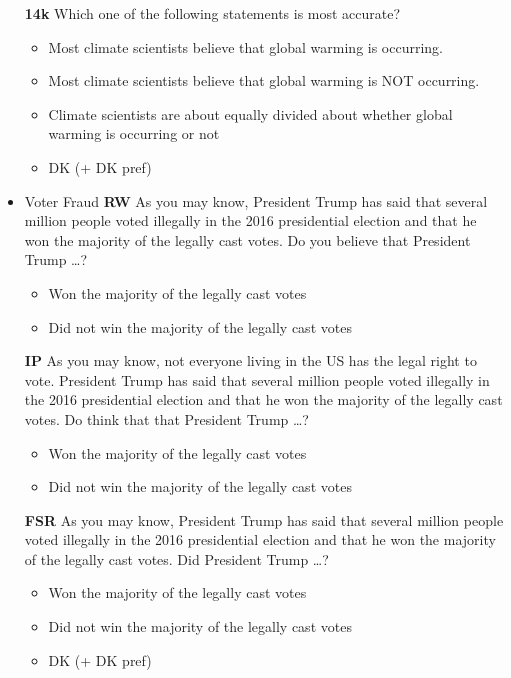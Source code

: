 \begin{itemize}
	\textbf{14k}\newline
	Which one of the following statements is most accurate?
	\begin{itemize}
		\item Most climate scientists believe that global warming is occurring.
		\item Most climate scientists believe that global warming is NOT occurring.
		\item Climate scientists are about equally divided about whether global warming is occurring or not
		\item DK (+ DK pref)
	\end{itemize}
	
	\item Voter Fraud\newline
	\textbf{RW}\newline
	As you may know, President Trump has said that several million people voted
	illegally in the 2016 presidential election and that he won the majority of the legally
	cast votes. Do you believe that President Trump \ldots?
	\begin{itemize}
		\item Won the majority of the legally cast votes
		\item Did not win the majority of the legally cast votes
	\end{itemize}
	
	\textbf{IP}\newline
	As you may know, not everyone living in the US has the legal right to vote. President
	Trump has said that several million people voted illegally in the 2016 presidential
	election and that he won the majority of the legally cast votes. Do think that that
	President Trump \ldots?
	\begin{itemize}
		\item Won the majority of the legally cast votes
		\item Did not win the majority of the legally cast votes
	\end{itemize}
	
	\textbf{FSR}\newline
	As you may know, President Trump has said that several million people voted
	illegally in the 2016 presidential election and that he won the majority of the legally
	cast votes. Did President Trump \ldots?
	\begin{itemize}
		\item Won the majority of the legally cast votes
		\item Did not win the majority of the legally cast votes
		\item DK (+ DK pref)
	\end{itemize}
	

\end{itemize}
